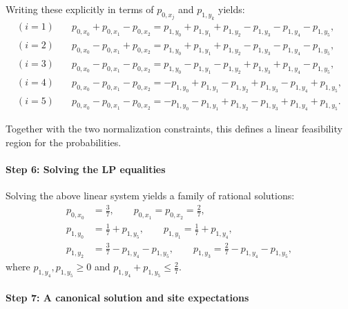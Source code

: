 \documentclass[pdflatex,sn-nature]{sn-jnl}%
\theoremstyle{thmstyleone}%
\theoremstyle{thmstyletwo}%
\theoremstyle{thmstylethree}%
\begin{document}
\begin{appendices}
Writing these explicitly in terms of $p_{0,x_j}$ and $p_{1,y_k}$ yields:
\begin{align*}
    (i = 1)\quad & p_{0, x_{0}} + p_{0, x_{1}} - p_{0, x_{2}}
      = p_{1, y_{0}} + p_{1, y_{1}} +p_{1, y_{2}} - p_{1, y_{3}} - p_{1, y_{4}} - p_{1, y_{5}},   \\
    (i = 2)\quad & p_{0, x_{0}} - p_{0, x_{1}} + p_{0, x_{2}}
      = p_{1, y_{0}} + p_{1, y_{1}} +p_{1, y_{2}} - p_{1, y_{3}} - p_{1, y_{4}} - p_{1, y_{5}},   \\
    (i = 3)\quad & p_{0, x_{0}} - p_{0, x_{1}} - p_{0, x_{2}}
      = p_{1, y_{0}} - p_{1, y_{1}} - p_{1, y_{2}} + p_{1, y_{3}} + p_{1, y_{4}} - p_{1, y_{5}},  \\
    (i = 4)\quad & p_{0, x_{0}} - p_{0, x_{1}} - p_{0, x_{2}}
      = -p_{1, y_{0}} + p_{1, y_{1}} - p_{1, y_{2}} + p_{1, y_{3}} - p_{1, y_{4}} + p_{1, y_{5}}, \\
    (i = 5)\quad & p_{0, x_{0}} - p_{0, x_{1}} - p_{0, x_{2}}
      = -p_{1, y_{0}} - p_{1, y_{1}} + p_{1, y_{2}} - p_{1, y_{3}} + p_{1, y_{4}} + p_{1, y_{5}}.
\end{align*}

Together with the two normalization constraints, this defines a linear feasibility region for the probabilities.

\paragraph{Step 6: Solving the LP equalities}

Solving the above linear system yields a family of rational solutions:
\[
    \begin{aligned}
        p_{0, x_{0}} & = \tfrac{3}{7},\qquad
        p_{0, x_{1}}=p_{0, x_{2}}=\tfrac{2}{7},                                        \\
        p_{1, y_{0}} & = \tfrac{1}{7}+p_{1, y_{5}},\qquad
        p_{1, y_{1}}=\tfrac{1}{7}+p_{1, y_{4}},                                       \\
        p_{1, y_{2}} & = \tfrac{3}{7}-p_{1, y_{4}}-p_{1, y_{5}},\qquad
        p_{1, y_{3}}=\tfrac{2}{7}-p_{1, y_{4}}-p_{1, y_{5}},
    \end{aligned}
\]
where $p_{1, y_{4}},p_{1, y_{5}}\ge 0$ and $p_{1, y_{4}}+p_{1, y_{5}}\le \tfrac{2}{7}$.

\paragraph{Step 7: A canonical solution and site expectations}


\end{appendices}
\end{document}
